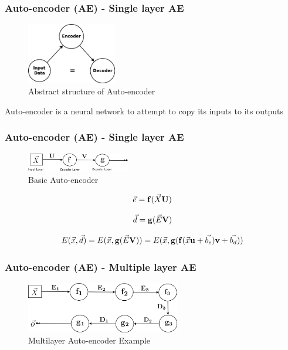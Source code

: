 \documentclass{beamer}
\begin{document}
\begin{frame}
\frametitle{Auto-encoder (AE) - Single layer AE}
\begin{figure}[t!]
    \centering
    \includegraphics[width=0.35\textwidth]{../paper/pictures/figures/AE.png}
    \caption{Abstract structure of Auto-encoder}
    \label{fig:AE}
\end{figure}

Auto-encoder is a neural network to attempt to copy its inputs to its outputs
\end{frame}

\begin{frame}
\frametitle{Auto-encoder (AE) - Single layer AE}
\begin{figure}[t!]
    \centering
    \includegraphics[width=0.4\textwidth]{../paper/pictures/figures/basic_AE.png}
    \caption{Basic Auto-encoder}
    \label{fig:basic_AE}
\end{figure}

$$\vec{e} = \bold{f}(\vec{X}\bold{U})$$

$$\vec{d} = \bold{g}(\vec{E}\bold{V})$$

$$E(\vec{x}, \vec{d}) = E(\vec{x}, \bold{g}(\vec{E}\bold{V})) = E(\vec{x}, \bold{g}(\bold{f}(\vec{x}\bold{u}+\vec{b_e})\bold{v}+\vec{b_d}))$$
\end{frame}

\begin{frame}
\frametitle{Auto-encoder (AE) - Multiple layer AE}
\begin{figure}[t!]
    \centering
    \includegraphics[width=0.6\textwidth]{../paper/pictures/figures/example_MAE.png}
    \caption{Multilayer Auto-encoder Example}
    \label{fig:example_MAE}
\end{figure}
\end{frame}
\end{document}
